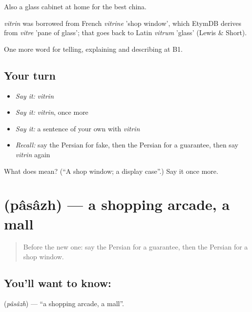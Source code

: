 Also a glass cabinet at home for the best china.

\begin{cousinweb}
\emph{vitrin} was borrowed from French \emph{vitrine} 'shop window', which EtymDB derives from \emph{vitre} 'pane of glass'; that goes back to Latin \emph{vitrum} 'glass' (Lewis \& Short).
\end{cousinweb}

\begin{grammarlens}[title={What you've built}]
One more word for telling, explaining and describing at B1.
\end{grammarlens}

\subsection*{Your turn}
\begin{itemize}
\raggedright
  \item \emph{Say it:} \emph{vitrin}
  \item \emph{Say it:} \emph{vitrin}, once more
  \item \emph{Say it:} a sentence of your own with \emph{vitrin}
  \item \emph{Recall:} say the Persian for fake, then the Persian for a guarantee, then say \emph{vitrin} again
\end{itemize}

\begin{tcolorbox}[breakable,colback=teal!4,colframe=teal!35!black,title={Before you move on}]
What does  mean? (\textquotedblleft{}A shop window; a display case\textquotedblright{}.) Say it once more.
\end{tcolorbox}
\section[\texorpdfstring{\fa{پاساژ} (pâsâzh)}{پاساژ (pâsâzh)}]{ (pâsâzh) — a shopping arcade, a mall}

\label{lesson:FA-C460-pasazh}



\begin{quote}
Before the new one: say the Persian for a guarantee, then the Persian for a shop window.
\end{quote}

\subsection*{You'll want to know: }
\textbf{} (\emph{pâsâzh}) — \textquotedblleft{}a shopping arcade, a mall\textquotedblright{}.

